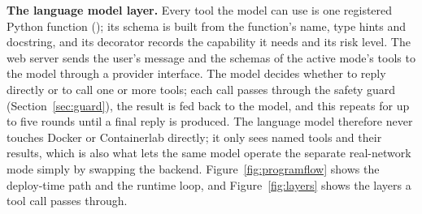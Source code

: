 \textbf{The language model layer.} Every tool the model can use is one
registered Python function (); its schema is built
from the function's name, type hints and docstring, and its decorator records
the capability it needs and its risk level. The web server sends the user's
message and the schemas of the active mode's tools to the model through a
provider interface. The model decides whether to reply directly or to call
one or more tools; each call passes through the safety guard
(Section~\ref{sec:guard}), the result is fed back to the model, and this
repeats for up to five rounds until a final reply is produced. The language
model therefore never touches Docker or Containerlab directly; it only sees
named tools and their results, which is also what lets the same model operate
the separate real-network mode simply by swapping the backend.
Figure~\ref{fig:programflow} shows the deploy-time path and the runtime
loop, and Figure~\ref{fig:layers} shows the layers a tool call passes
through.

